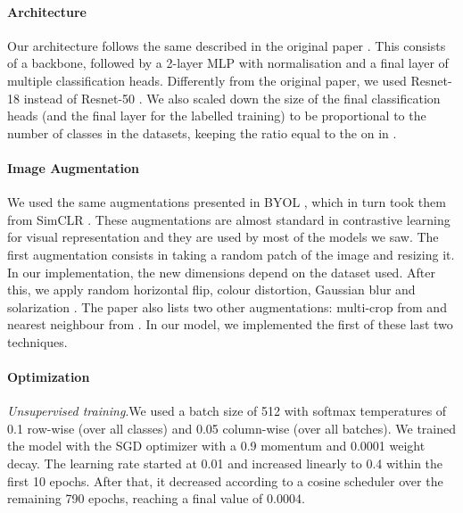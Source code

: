 \documentclass{article}
\begin{document}
\paragraph{Architecture}
Our architecture follows the same described in the original paper \cite{self_classifier}. This consists of a backbone, followed by a 2-layer MLP with normalisation and a final layer of multiple classification heads. 
Differently from the original paper, we used Resnet-18 instead of Resnet-50 \cite{resnet}. 
We also scaled down the size of the final classification heads (and the final layer for the labelled training) to be proportional to the number of classes in the datasets, keeping the ratio equal to the on in \cite{self_classifier}.


\paragraph{Image Augmentation}
We used the same augmentations presented in BYOL \cite{byol}, which in turn took them from SimCLR \cite{simclr}\cite{byol}. These augmentations are almost standard in contrastive learning for visual representation and they are used by most of the models we saw. The first augmentation consists in taking a random patch of the image and resizing it. In our implementation, the new dimensions depend on the dataset used. After this, we apply random horizontal flip, colour distortion, Gaussian blur and solarization \cite{byol}. The paper also lists two other augmentations: multi-crop from \cite{swav} and nearest neighbour from \cite{nn_augmentation}. In our model, we implemented the first of these last two techniques.

\paragraph{Optimization} 

\textit{Unsupervised training}.We used a batch size of 512 with softmax temperatures of 0.1 row-wise (over all classes) and 0.05 column-wise (over all batches). We trained the model with the SGD optimizer with a 0.9 momentum and 0.0001 weight decay. The learning rate started at 0.01 and increased linearly to 0.4 within the first 10 epochs. After that, it decreased according to a cosine scheduler over the remaining 790 epochs, reaching a final value of 0.0004.
\end{document}
